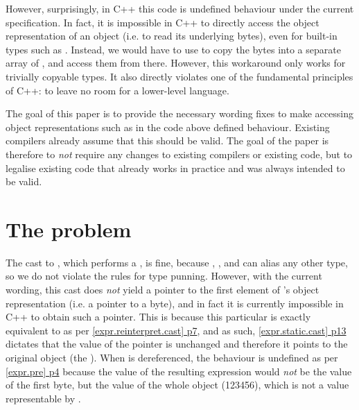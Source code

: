 However, surprisingly, in C++ this code is undefined behaviour under the current specification. In fact, it is impossible in C++ to directly access the object representation of an object (i.e. to read its underlying bytes), even for built-in types such as . Instead, we would have to use  to copy the bytes into a separate array of , and access them from there. However, this workaround only works for trivially copyable types. It also directly violates one of the fundamental principles of C++: to leave no room for a lower-level language.

The goal of this paper is to provide the necessary wording fixes to make accessing object representations such as in the code above defined behaviour. Existing compilers already assume that this should be valid. The goal of the paper is therefore to \emph{not} require any changes to existing compilers or existing code, but to legalise existing code that already works in practice and was always intended to be valid.

\section{The problem}

The cast to , which performs a , is fine, because , , and  can alias any other type, so we do not violate the rules for type punning. However, with the current wording, this cast does \emph{not} yield a pointer to the first element of 's object representation (i.e. a pointer to a byte), and in fact it is currently impossible in C++ to obtain such a pointer. This is because this particular  is exactly equivalent to  as per \href{https://timsong-cpp.github.io/cppwp/n4861/expr.reinterpret.cast#7}{[expr.reinterpret.cast] p7}, and as such, \href{https://timsong-cpp.github.io/cppwp/n4861/expr.static.cast#13}{[expr.static.cast] p13} dictates that the value of the pointer is unchanged and therefore it points to the original object (the ). When  is dereferenced, the behaviour is undefined as per \href{https://timsong-cpp.github.io/cppwp/n4861/expr.pre#4}{[expr.pre] p4} because the value of the resulting expression would \emph{not} be the value of the first byte, but the value of the whole  object (123456), which is not a value representable by .

